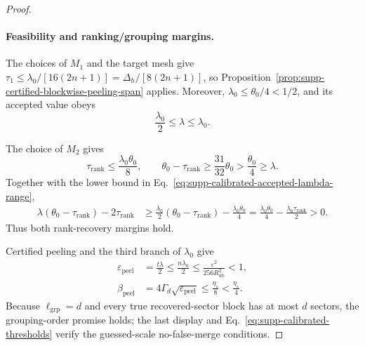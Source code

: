 \documentclass[
  aps,
  prx,
  reprint,
  superscriptaddress,
  amsmath,
  amssymb,
  nofootinbib,
  longbibliography
]{revtex4-2}
\begin{document}
\begin{proof}
\leavevmode
\paragraph{Feasibility and ranking/grouping margins.}
The choices of $M_1$ and the target mesh give
$\tau_1\le\lambda_0/[16(2n+1)]
=\Delta_h/[8(2n+1)]$, so
Proposition~\ref{prop:supp-certified-blockwise-peeling-span} applies.
Moreover, $\lambda_0\le\theta_0/4<1/2$, and its accepted value obeys
\begin{equation}
\frac{\lambda_0}{2}\le\lambda\le\lambda_0.
\label{eq:supp-calibrated-accepted-lambda-range}
\end{equation}

The choice of $M_2$ gives
\begin{equation}
\tau_{\mathrm{rank}}\le\frac{\lambda_0\theta_0}{8},
\qquad
\theta_0-\tau_{\mathrm{rank}}
\ge\frac{31}{32}\theta_0
>\frac{\theta_0}{4}\ge\lambda.
\end{equation}
Together with the lower bound in
Eq.~\eqref{eq:supp-calibrated-accepted-lambda-range},
\begin{align*}
\lambda(\theta_0-\tau_{\mathrm{rank}})
-2\tau_{\mathrm{rank}}
&\ge
\frac{\lambda_0}{2}(\theta_0-\tau_{\mathrm{rank}})
-\frac{\lambda_0\theta_0}{4}
=\frac{\lambda_0\theta_0}{4}
-\frac{\lambda_0\tau_{\mathrm{rank}}}{2}
>0.
\end{align*}
Thus both rank-recovery margins hold.

Certified peeling and the third branch of $\lambda_0$ give
\begin{align}
\varepsilon_{\mathrm{peel}}
&=\frac{t\lambda}{2}
\le\frac{n\lambda_0}{2}
\le
\frac{\varepsilon^2}{256R_{\mathrm{ub}}^2}
<1,
\nonumber\\
\beta_{\mathrm{peel}}
&=4\Gamma_d\sqrt{\varepsilon_{\mathrm{peel}}}
\le\frac{\eta_s}{8}
<\frac{\eta_s}{4}.
\end{align}
Because \(\ell_{\mathrm{grp}}=d\) and every true recovered-sector block has
at most \(d\) sectors, the grouping-order promise holds; the last display
and
Eq.~\eqref{eq:supp-calibrated-thresholds} verify the guessed-scale
no-false-merge conditions.


\end{proof}
\end{document}
